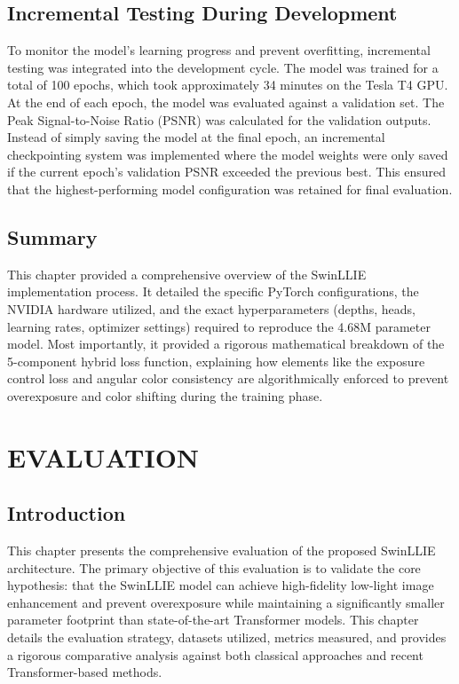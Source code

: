 \documentclass[12pt, a4paper]{report}
\begin{document}
\section{Incremental Testing During Development}
To monitor the model's learning progress and prevent overfitting, incremental testing was integrated into the development cycle. The model was trained for a total of 100 epochs, which took approximately 34 minutes on the Tesla T4 GPU. At the end of each epoch, the model was evaluated against a validation set. The Peak Signal-to-Noise Ratio (PSNR) was calculated for the validation outputs. Instead of simply saving the model at the final epoch, an incremental checkpointing system was implemented where the model weights were only saved if the current epoch's validation PSNR exceeded the previous best. This ensured that the highest-performing model configuration was retained for final evaluation.

\section{Summary}
This chapter provided a comprehensive overview of the SwinLLIE implementation process. It detailed the specific PyTorch configurations, the NVIDIA hardware utilized, and the exact hyperparameters (depths, heads, learning rates, optimizer settings) required to reproduce the 4.68M parameter model. Most importantly, it provided a rigorous mathematical breakdown of the 5-component hybrid loss function, explaining how elements like the exposure control loss and angular color consistency are algorithmically enforced to prevent overexposure and color shifting during the training phase.


\chapter{EVALUATION}
\section{Introduction}
This chapter presents the comprehensive evaluation of the proposed SwinLLIE architecture. The primary objective of this evaluation is to validate the core hypothesis: that the SwinLLIE model can achieve high-fidelity low-light image enhancement and prevent overexposure while maintaining a significantly smaller parameter footprint than state-of-the-art Transformer models. This chapter details the evaluation strategy, datasets utilized, metrics measured, and provides a rigorous comparative analysis against both classical approaches and recent Transformer-based methods.
\end{document}
